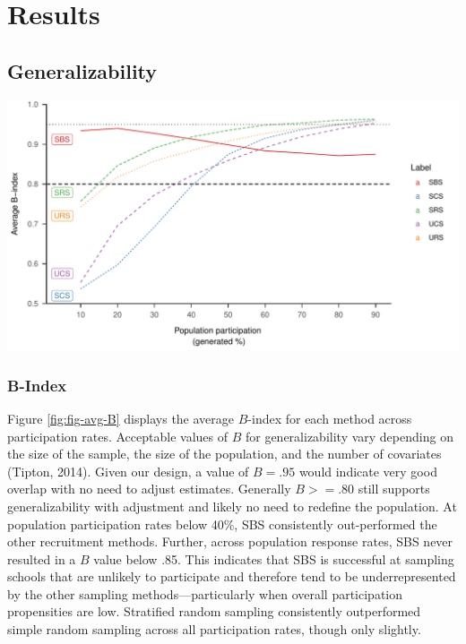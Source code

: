 \documentclass[english,man,floatsintext]{apa6}
\begin{document}
\hypertarget{results}{%
\section{Results}\label{results}}

\hypertarget{generalizability-1}{%
\subsection{Generalizability}\label{generalizability-1}}



\includegraphics{6---Paper_files/figure-latex/fig-avg-B-1.pdf}
 

\hypertarget{b-index}{%
\subsubsection{B-Index}\label{b-index}}

Figure \ref{fig:fig-avg-B} displays the average \(B\)-index for each method across participation rates. Acceptable values of \(B\) for generalizability vary depending on the size of the sample, the size of the population, and the number of covariates (Tipton, 2014). Given our design, a value of \(B = .95\) would indicate very good overlap with no need to adjust estimates. Generally \(B >= .80\) still supports generalizability with adjustment and likely no need to redefine the population. At population participation rates below 40\%, SBS consistently out-performed the other recruitment methods. Further, across population response rates, SBS never resulted in a \(B\) value below .85. This indicates that SBS is successful at sampling schools that are unlikely to participate and therefore tend to be underrepresented by the other sampling methods---particularly when overall participation propensities are low. Stratified random sampling consistently outperformed simple random sampling across all participation rates, though only slightly.
\end{document}
